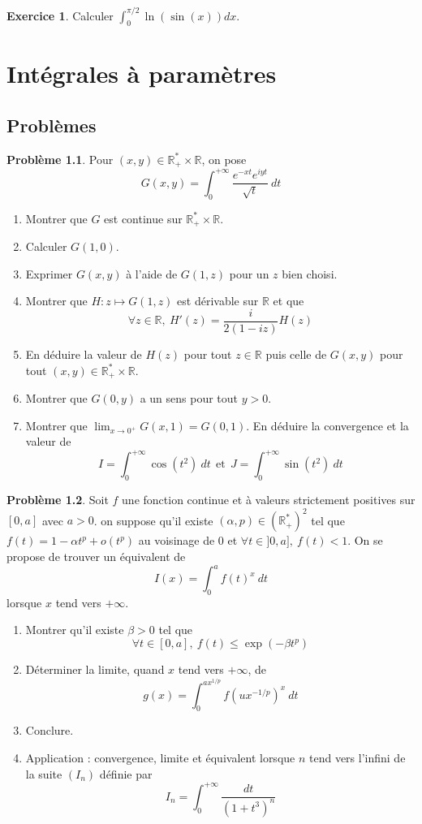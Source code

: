 \documentclass[french]{book}
\newcommand{\R}{\mathbb{R}}
\newcommand{\st}{^*}
\theoremstyle{definition}
\newtheorem{ex}{Exercice}[chapter]
\newtheorem{pro}{Problème}[chapter]
\begin{document}
\begin{ex}
	Calculer $\displaystyle\int_{0}^{\pi/2}\ln(\sin(x))dx$.
\end{ex}

\chapter{Intégrales à paramètres}

\section{Problèmes}

\begin{pro}
	Pour $(x,y)\in\R_+\st\times\R$, on pose $$G(x,y)=\int_{0}^{+\infty}\frac{e^{-xt}e^{iyt}}{\sqrt{t}}\ dt$$
	\begin{enumerate}
		\item Montrer que $G$ est continue sur $\R_+\st\times\R$.
		\item Calculer $G(1,0)$.
		\item Exprimer $G(x,y)$ à l'aide de $G(1,z)$ pour un $z$ bien choisi.
		\item Montrer que $H:z\mapsto G(1,z)$ est dérivable sur $\R$ et que $$\forall z\in\R,\ H'(z)=\frac{i}{2(1-iz)}H(z)$$
		\item En déduire la valeur de $H(z)$ pour tout $z\in\R$ puis celle de $G(x,y)$ pour tout $(x,y)\in\R_+\st\times\R$.
		\item Montrer que $G(0,y)$ a un sens pour tout $y>0$.
		\item Montrer que $\displaystyle\lim_{x\to 0^+}G(x,1)=G(0,1)$. En déduire la convergence et la valeur de $$I=\int_{0}^{+\infty}\cos(t^2)\ dt \ \ \text{et} \ \ J=\int_{0}^{+\infty}\sin(t^2)\ dt$$
	\end{enumerate}
\end{pro}

\begin{pro}
	Soit $f$ une fonction continue et à valeurs strictement positives sur $[0,a]$ avec $a>0$. on suppose qu'il existe $(\alpha,p)\in(\R_+\st)^2$ tel que $f(t)=1-\alpha t^p+o(t^p)$ au voisinage de $0$ et $\forall t\in]0,a],\ f(t)<1$. On se propose de trouver un équivalent de $$I(x)=\int_{0}^{a}f(t)^x\ dt$$ lorsque $x$ tend vers $+\infty$.
	\begin{enumerate}
		\item Montrer qu'il existe $\beta>0$ tel que $$\forall t\in[0,a],\ f(t)\leqslant\exp(-\beta t^p)$$
		\item Déterminer la limite, quand $x$ tend vers $+\infty$, de $$g(x)=\int_{0}^{ax^{1/p}}f\left(ux^{-1/p}\right)^x\ dt$$
		\item Conclure.
		\item Application : convergence, limite et équivalent lorsque $n$ tend vers l'infini de la suite $(I_n)$ définie par $$I_n=\int_{0}^{+\infty}\frac{dt}{(1+t^3)^n}$$
	\end{enumerate}
\end{pro}
\end{document}
